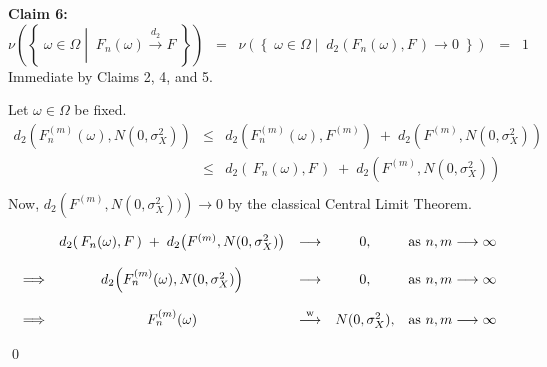 \mbox{}
\vskip 0.6cm
\noindent
\textbf{Claim 6:}\;
\begin{equation*}
\nu\!\left(\left\{\;
\omega \in \Omega
\;\left\vert\;\;
F_{n}(\omega) \overset{d_{2}}{\longrightarrow} F
\right.
\;\right\}\right)
\;\; = \;\;
\nu\!\left(\left\{\;
\omega \in \Omega
\;\left\vert\;\;
d_{2}\!\left(F_{n}(\omega),F\,\right) \longrightarrow 0
\right.
\;\right\}\right)
\;\; = \;\;
1
\end{equation*}
Immediate by Claims 2, 4, and 5.

\vskip 0.5cm
\noindent
Let $\omega \in \Omega$ be fixed.
\begin{eqnarray*}
d_{2}\!\left(F^{(m)}_{n}(\omega),N(0,\sigma^{2}_{X})\right)
& \leq & d_{2}\!\left(F^{(m)}_{n}(\omega),F^{(m)}\right) \;+\; d_{2}\!\left(F^{(m)},N(0,\sigma^{2}_{X})\right) \\
& \leq & d_{2}\!\left(\,F_{n}(\omega),F\,\right) \;+\; d_{2}\!\left(F^{(m)},N(0,\sigma^{2}_{X})\right) \\
\end{eqnarray*}
Now, $d_{2}\!\left(F^{(m)},N(0,\sigma^{2}_{X}))\right) \longrightarrow 0$ by the classical Central Limit Theorem.

\begin{equation*}
\begin{array}{ccccl}
& d_{2}\!\left(\,F_{n}(\omega),F\,\right) \;+\; d_{2}\!\left(F^{(m)},N(0,\sigma^{2}_{X})\right) &\longrightarrow& 0, & \textnormal{as $n, m \longrightarrow \infty$}
\\ \\
\Longrightarrow& d_{2}\!\left(F^{(m)}_{n}(\omega),N(0,\sigma^{2}_{X})\right) &\longrightarrow& 0, &\textnormal{as $n, m \longrightarrow \infty$}
\\ \\
\Longrightarrow& F^{(m)}_{n}(\omega) & \overset{\textnormal{w}}{\longrightarrow}& N(0,\sigma^{2}_{X}), &\textnormal{as $n, m \longrightarrow \infty$}
\end{array}
\end{equation*}

\qed

